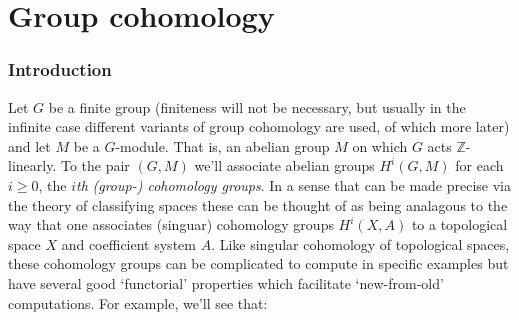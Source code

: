 \documentclass[11pt]{amsart}
\numberwithin{equation}{section}
\theoremstyle{remark}
\theoremstyle{remark}
\theoremstyle{remark}
\theoremstyle{definition}
\theoremstyle{definition}
\theoremstyle{definition}
\theoremstyle{definition}
\theoremstyle{definition}
\theoremstyle{definition}
\begin{document}
\part{Group cohomology}

\section{Introduction}

Let $G$ be a finite group (finiteness will not be necessary, but usually in the infinite case different variants of group cohomology are used, of which more later) and let $M$ be a $G$-module. That is, an abelian group $M$ on which $G$ acts $\mathbb{Z}$-linearly.  To the pair $(G,M)$ we'll associate abelian groups
$H^i(G,M)$ for each $i\geq 0$,
the $i$\textit{th} \textit{(group-) cohomology groups}. In a sense that can be made precise via the theory of classifying spaces these can be thought of as being analagous to the way that one associates (singuar) cohomology groups $H^i(X,A)$ to a topological space $X$ and coefficient system $A$. Like singular cohomology of topological spaces, these cohomology groups can be complicated to compute in specific examples but have several good `functorial' properties which facilitate `new-from-old' computations. For example, we'll see that:
\end{document}
